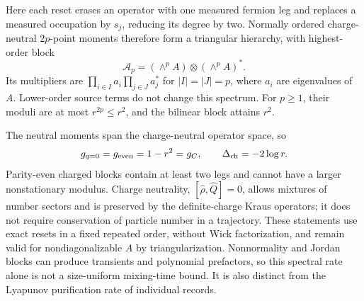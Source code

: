 \documentclass[aps,prb,10pt,twocolumn,superscriptaddress,longbibliography,floatfix]{revtex4-2}
\begin{document}
{Here each reset erases an operator with one measured fermion leg and replaces a measured occupation by $s_j$, reducing its degree by two. Normally ordered charge-neutral $2p$-point moments therefore form a triangular hierarchy, with highest-order block
\begin{equation}
 \mathcal A_p=(\wedge^p A)\otimes(\wedge^p A)^*.
 \label{eq:ExteriorPowerChannel}
\end{equation}
Its multipliers are $\prod_{i\in I}a_i\prod_{j\in J}a_j^*$ for $|I|=|J|=p$, where $a_i$ are eigenvalues of $A$. Lower-order source terms do not change this spectrum. For $p\geq1$, their moduli are at most $r^{2p}\leq r^2$, and the bilinear block attains $r^2$. \par\noindent\begin{minipage}{\columnwidth}
The neutral moments span the charge-neutral operator space, so
\begin{equation}
 g_{q=0}=g_{\rm even}=1-r^2=g_C,\qquad
 \Delta_{\rm ch}=-2\log r.
 \label{eq:NeutralChannelGap}
\end{equation}
Parity-even charged blocks contain at least two legs and cannot have a larger nonstationary modulus. Charge neutrality, $[\hat\rho,\hat Q]=0$, allows mixtures of number sectors and is preserved by the definite-charge Kraus operators; it does not require conservation of particle number in a trajectory. These statements use exact resets in a fixed repeated order, without Wick factorization, and remain valid for nondiagonalizable $A$ by triangularization. Nonnormality and Jordan blocks can produce transients and polynomial prefactors, so this spectral rate alone is not a size-uniform mixing-time bound. It is also distinct from the Lyapunov purification rate of individual records.
\end{minipage}
}



\end{document}
